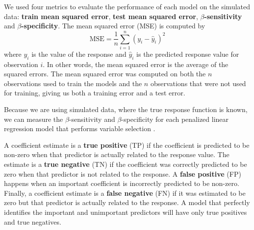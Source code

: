 \documentclass{article}
\begin{document}
	We used four metrics to evaluate the performance of each model on the simulated data: \textbf{train mean squared error}, \textbf{test mean squared error}, \textbf{$\beta$-sensitivity} and \textbf{$\beta$-specificity}. The mean squared error (MSE) is computed by
	\begin{equation}
		\text{MSE} = \frac{1}{n}\sum\limits_{i = 1}^n (y_i - \hat{y}_i)^2
	\end{equation}
	where $y_i$ is the value of the response and $\hat{y}_i$ is the predicted response value for observation $i$. In other words, the mean squared error is the average of the squared errors. The mean squared error was computed on both the $n$ observations used to train the models and the $n$ observations that were not used for training, giving us both a training error and a test error.
	
	Because we are using simulated data, where the true response function is known, we can measure the $\beta$-sensitivity and $\beta$-specificity for each penalized linear regression model that performs variable selection \cite{liu2020logsum}. 

	A coefficient estimate is a \textbf{true positive} (TP) if the coefficient is predicted to be non-zero when that predictor is actually related to the response value. The estimate is a \textbf{true negative} (TN) if the coefficient was correctly predicted to be zero when that predictor is not related to the response. A \textbf{false positive} (FP) happens when an important coefficient is incorrectly predicted to be non-zero. Finally, a coefficient estimate is a \textbf{false negative} (FN) if it was estimated to be zero but that predictor is actually related to the response. A model that perfectly identifies the important and unimportant predictors will have only true positives and true negatives.
	
\end{document}
